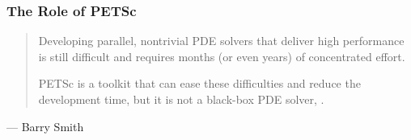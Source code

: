 \begin{frame}[fragile]

\frametitle{The Role of PETSc}

\vspace*{\fill}
\begin{minipage}{\linewidth}
\begin{quote}
\Large Developing parallel, nontrivial PDE solvers that deliver high performance is still difficult and requires
months (or even years) of concentrated effort.

\medskip

PETSc is a toolkit that can ease these difficulties and reduce the development time, but it is not a black-box PDE
solver, \color{blue}{nor a silver bullet}.
\end{quote}
\qquad --- Barry Smith
\end{minipage}


\end{frame}


